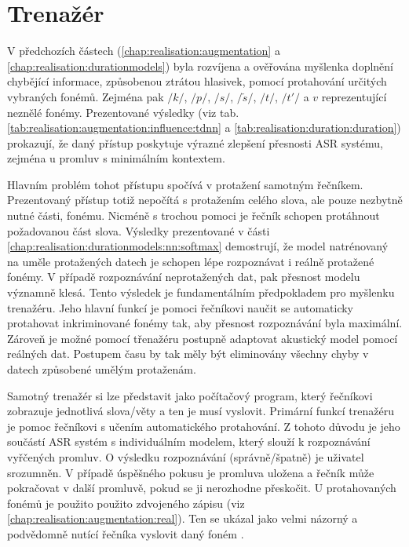 \section{Trenažér}
\label{chap:realisation:trainer}

V předchozích částech (\ref{chap:realisation:augmentation} a \ref{chap:realisation:durationmodels}) byla rozvíjena a ověřována myšlenka doplnění chybějící informace, způsobenou ztrátou hlasivek, pomocí protahování určitých vybraných fonémů. Zejména pak $/k/$, $/p/$, $/s/$, $/\check{s}/$, $/t/$, $/t'/$ a $v$ reprezentující neznělé fonémy. Prezentované výsledky (viz tab. \ref{tab:realisation:augmentation:influence:tdnn} a \ref{tab:realisation:duration:duration}) prokazují, že daný přístup poskytuje výrazné zlepšení přesnosti ASR systému, zejména u promluv s minimálním kontextem.

Hlavním problém tohot přístupu spočívá v protažení samotným řečníkem. Prezentovaný přístup totiž nepočítá s protažením celého slova, ale pouze nezbytně nutné části, fonému. Nicméně s trochou pomoci je řečník schopen protáhnout požadovanou část slova. Výsledky prezentované v části \ref{chap:realisation:durationmodels:nn:softmax} demostrují, že model natrénovaný na uměle protažených datech je schopen lépe rozpoznávat i reálně protažené fonémy. V případě rozpoznávání neprotažených dat, pak přesnost modelu významně klesá. Tento výsledek je fundamentálním předpokladem pro myšlenku trenažéru. Jeho hlavní funkcí je pomoci řečníkovi naučit se automaticky protahovat inkriminované fonémy tak, aby přesnost rozpoznávání byla maximální. Zároveň je možné pomocí třenažéru postupně adaptovat akustický model pomocí reálných dat. Postupem času by tak měly být eliminovány všechny chyby v datech způsobené umělým protaženám.

Samotný trenažér si lze představit jako počítačový program, který řečníkovi zobrazuje jednotlivá slova/věty a ten je musí vyslovit. Primární funkcí trenažéru je pomoc řečníkovi s učením automatického protahování. Z tohoto důvodu je jeho součástí ASR systém s individuálním modelem, který slouží k rozpoznávání vyřčených promluv. O výsledku rozpoznávání (správně/špatně) je uživatel srozumněn. V případě úspěšného pokusu je promluva uložena a řečník může pokračovat v další promluvě, pokud se ji nerozhodne přeskočit. U protahovaných fonémů je použito použito zdvojeného zápisu (viz \ref{chap:realisation:augmentation:real}). Ten se ukázal jako velmi názorný a podvědomně nutící řečníka vyslovit daný foném .

